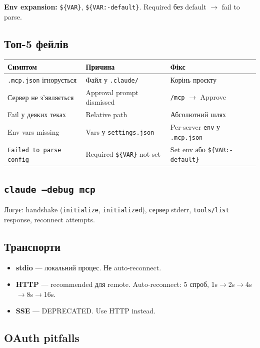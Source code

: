 \documentclass[11pt,a4paper]{article}
\begin{document}
\textbf{Env expansion:} \texttt{\$\{VAR\}}, \texttt{\$\{VAR:-default\}}. Required без default $\to$ fail to parse.

\subsection{Топ-5 фейлів}

\begin{tabular}{p{5cm}p{4cm}p{5cm}}
\hline
\textbf{Симптом} & \textbf{Причина} & \textbf{Фікс} \\
\hline
\texttt{.mcp.json} ігнорується & Файл у \texttt{.claude/} & Корінь проєкту \\
Сервер не з'являється & Approval prompt dismissed & \texttt{/mcp} $\to$ Approve \\
Fail у деяких теках & Relative path & Абсолютний шлях \\
Env vars missing & Vars у \texttt{settings.json} & Per-server \texttt{env} у \texttt{.mcp.json} \\
\texttt{Failed to parse config} & Required \texttt{\$\{VAR\}} not set & Set env або \texttt{\$\{VAR:-default\}} \\
\hline
\end{tabular}

\subsection{\texttt{claude --debug mcp}}

Логує: handshake (\texttt{initialize}, \texttt{initialized}), сервер stderr, \texttt{tools/list} response, reconnect attempts.

\subsection{Транспорти}

\begin{itemize}
\item \textbf{stdio} --- локальний процес. Не auto-reconnect.
\item \textbf{HTTP} --- recommended для remote. Auto-reconnect: 5 спроб, 1s$\to$2s$\to$4s$\to$8s$\to$16s.
\item \textbf{SSE} --- DEPRECATED. Use HTTP instead.
\end{itemize}

\subsection{OAuth pitfalls}
\end{document}
